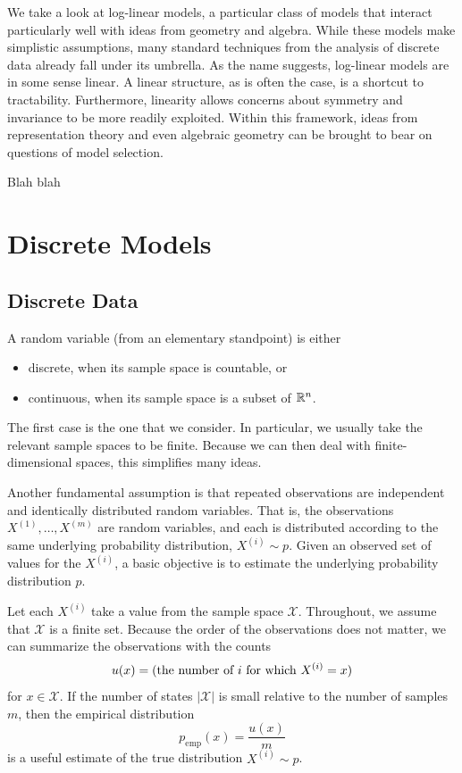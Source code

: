 \documentclass[cclicense]{hmcthesis}
\newcommand*{\x}[1]{\ensuremath{X^{(#1)}}}
\providecommand*{\xs}{\mathcal X}
\newcommand*{\emp}{\mathrm{emp}}
\numberwithin{equation}{chapter}
\numberwithin{thmcounter}{chapter}
\begin{document}
    We take a look at log-linear models, a particular class of models that
    interact particularly well with ideas from geometry and algebra.  While
    these models make simplistic assumptions, many standard techniques from the
    analysis of discrete data already fall under its umbrella.  As the name
    suggests, log-linear models are in some sense linear.  A linear structure,
    as is often the case, is a shortcut to tractability.  Furthermore, linearity
    allows concerns about symmetry and invariance to be more readily exploited.
    Within this framework, ideas from representation theory and even algebraic
    geometry can be brought to bear on questions of model selection.

    Blah blah

\chapter{Discrete Models}

    \section{Discrete Data}

    A random variable (from an elementary standpoint) is either 
    \begin{itemize}\noparspace
    \item discrete, when its sample space is countable, or
    \item continuous, when its sample space is a subset of $\mathbb{R}^n$.
    \end{itemize}
    The first case is the one that we consider.  In particular, we usually take
    the relevant sample spaces to be finite.  Because we can then deal with
    finite-dimensional spaces, this simplifies many ideas.

    Another fundamental assumption is that repeated observations are independent and
    identically distributed random variables.  That is, the observations $\x 1,
    \ldots, \x m$ are random variables, and each is distributed according to the
    same underlying probability distribution, $\x i \sim p$.  Given an observed
    set of values for the $\x i$, a basic objective is to estimate the
    underlying probability distribution $p$.

    Let each $\x i$ take a value from the sample space $\xs$.  Throughout, we
    assume that $\xs$ is a finite set.  Because the order of the observations
    does not matter, we can summarize the observations with the counts
    \begin{equation*}
        u(x) = \pdel{\text{the number of $i$ for which $\x i = x$}}
    \end{equation*}
    for $x \in \xs$.  If the number of states $|\xs|$ is small relative to the
    number of samples $m$, then the empirical distribution
    \begin{equation}
        p_\emp(x) = \frac{u(x)}{m}
        \label{eq:empirical}
    \end{equation}
    is a useful estimate of the true distribution $\x i \sim p$.
\end{document}

